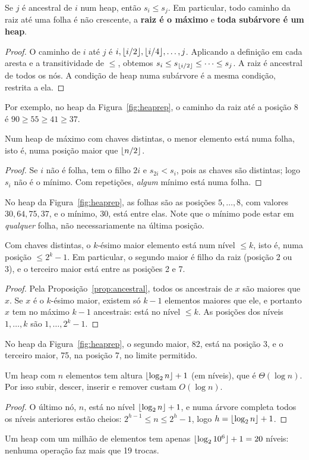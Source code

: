 \begin{prop}\label{prop:ancestral}
Se $j$ é ancestral de $i$ num heap, então $s_i\le s_j$. Em particular, todo caminho da raiz até uma folha é não crescente, a \textbf{raiz é o máximo} e \textbf{toda subárvore é um heap}.
\end{prop}
\begin{proof}
O caminho de $i$ até $j$ é $i,\lfloor i/2\rfloor,\lfloor i/4\rfloor,\dots,j$. Aplicando a definição em cada aresta e a transitividade de $\le$, obtemos $s_i\le s_{\lfloor i/2\rfloor}\le\cdots\le s_j$. A raiz é ancestral de todos os nós. A condição de heap numa subárvore é a mesma condição, restrita a ela.
\end{proof}
Por exemplo, no heap da Figura~\ref{fig:heaprep}, o caminho da raiz até a posição 8 é $90\ge55\ge41\ge37$.

\begin{prop}
Num heap de máximo com chaves distintas, o menor elemento está numa folha, isto é, numa posição maior que $\lfloor n/2\rfloor$.
\end{prop}
\begin{proof}
Se $i$ não é folha, tem o filho $2i$ e $s_{2i}<s_i$, pois as chaves são distintas; logo $s_i$ não é o mínimo. Com repetições, \emph{algum} mínimo está numa folha.
\end{proof}
No heap da Figura~\ref{fig:heaprep}, as folhas são as posições $5,\dots,8$, com valores $30,64,75,37$, e o mínimo, $30$, está entre elas. Note que o mínimo pode estar em \emph{qualquer} folha, não necessariamente na última posição.

\begin{prop}
Com chaves distintas, o $k$-ésimo maior elemento está num nível $\le k$, isto é, numa posição $\le 2^k-1$. Em particular, o segundo maior é filho da raiz (posição 2 ou 3), e o terceiro maior está entre as posições 2 e 7.
\end{prop}
\begin{proof}
Pela Proposição~\ref{prop:ancestral}, todos os ancestrais de $x$ são maiores que $x$. Se $x$ é o $k$-ésimo maior, existem só $k-1$ elementos maiores que ele, e portanto $x$ tem no máximo $k-1$ ancestrais: está no nível $\le k$. As posições dos níveis $1,\dots,k$ são $1,\dots,2^k-1$.
\end{proof}
No heap da Figura~\ref{fig:heaprep}, o segundo maior, 82, está na posição 3, e o terceiro maior, 75, na posição 7, no limite permitido.

\begin{prop}[Altura]
Um heap com $n$ elementos tem altura $\lfloor\log_2 n\rfloor+1$ (em níveis), que é $\Theta(\log n)$. Por isso subir, descer, inserir e remover custam $O(\log n)$.
\end{prop}
\begin{proof}
O último nó, $n$, está no nível $\lfloor\log_2n\rfloor+1$, e numa árvore completa todos os níveis anteriores estão cheios: $2^{h-1}\le n\le 2^h-1$, logo $h=\lfloor\log_2n\rfloor+1$.
\end{proof}
Um heap com um milhão de elementos tem apenas $\lfloor\log_2 10^6\rfloor+1=20$ níveis: nenhuma operação faz mais que 19 trocas.

